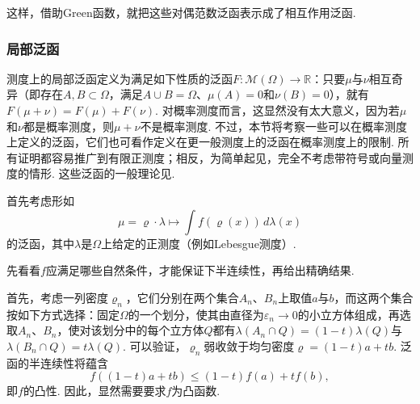 这样，借助Green函数，就把这些对偶范数泛函表示成了相互作用泛函.

\subsubsection{局部泛函}\label{sec:7.1.2}
测度上的局部泛函定义为满足如下性质的泛函$F:\mathscr M(\Omega)\to\mathbb R$：只要$\mu$与$\nu$相互奇异（即存在$A,B\subset\Omega$，满足$A\cup B=\Omega$、$\mu(A)=0$和$\nu(B)=0$），就有$F(\mu+\nu)=F(\mu)+F(\nu)$. 对概率测度而言，这显然没有太大意义，因为若$\mu$和$\nu$都是概率测度，则$\mu+\nu$不是概率测度. 不过，本节将考察一些可以在概率测度上定义的泛函，它们也可看作定义在更一般测度上的泛函在概率测度上的限制. 所有证明都容易推广到有限正测度；相反，为简单起见，完全不考虑带符号或向量测度的情形. 这些泛函的一般理论见\cite{b67}.

首先考虑形如
\[
 \mu=\varrho\cdot\lambda\mapsto\int f(\varrho(x))\,d\lambda(x)
\]
的泛函，其中$\lambda$是$\Omega$上给定的正测度（例如Lebesgue测度）.

先看看$f$应满足哪些自然条件，才能保证下半连续性，再给出精确结果.

首先，考虑一列密度$\varrho_n$，它们分别在两个集合$A_n$、$B_n$上取值$a$与$b$，而这两个集合按如下方式选择：固定$\Omega$的一个划分，使其由直径为$\varepsilon_n\to0$的小立方体组成，再选取$A_n$、$B_n$，使对该划分中的每个立方体$Q$都有$\lambda(A_n\cap Q)=(1-t)\lambda(Q)$与$\lambda(B_n\cap Q)=t\lambda(Q)$. 可以验证，$\varrho_n$弱收敛于均匀密度$\varrho=(1-t)a+tb$. 泛函的半连续性将蕴含
\[
 f((1-t)a+tb)\leq(1-t)f(a)+tf(b),
\]
即$f$的凸性. 因此，显然需要要求$f$为凸函数.

